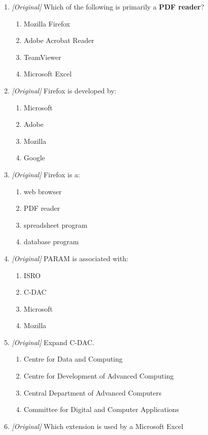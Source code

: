 \documentclass[11pt]{article}
\begin{document}
\begin{enumerate}[label=\textbf{Q\arabic*.}, leftmargin=*]
\begin{enumerate}[label=\Alph*.]
  \end{enumerate}
\item \textit{[Original]} Which of the following is primarily a \textbf{PDF
  reader}?
  \begin{enumerate}[label=\Alph*.]
    \item Mozilla Firefox
    \item Adobe Acrobat Reader
    \item TeamViewer
    \item Microsoft Excel
  \end{enumerate}
\item \textit{[Original]} Firefox is developed by:
  \begin{enumerate}[label=\Alph*.]
    \item Microsoft
    \item Adobe
    \item Mozilla
    \item Google
  \end{enumerate}
\item \textit{[Original]} Firefox is a:
  \begin{enumerate}[label=\Alph*.]
    \item web browser
    \item PDF reader
    \item spreadsheet program
    \item database program
  \end{enumerate}
\item \textit{[Original]} PARAM is associated with:
  \begin{enumerate}[label=\Alph*.]
    \item ISRO
    \item C-DAC
    \item Microsoft
    \item Mozilla
  \end{enumerate}
\item \textit{[Original]} Expand C-DAC.
  \begin{enumerate}[label=\Alph*.]
    \item Centre for Data and Computing
    \item Centre for Development of Advanced Computing
    \item Central Department of Advanced Computers
    \item Committee for Digital and Computer Applications
  \end{enumerate}
\item \textit{[Original]} Which extension is used by a Microsoft Excel

\end{enumerate}
\end{document}
